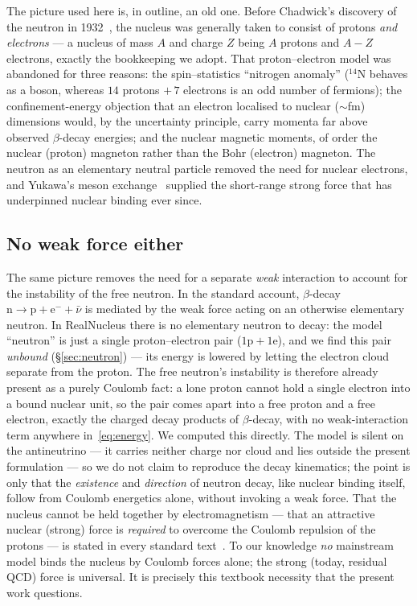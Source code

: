 \documentclass[11pt]{article}
\begin{document}
The picture used here is, in outline, an old one. Before Chadwick's discovery of the neutron in
1932~\cite{Chadwick1932}, the nucleus was generally taken to consist of protons \emph{and
electrons} --- a nucleus of mass $A$ and charge $Z$ being $A$ protons and $A-Z$ electrons,
exactly the bookkeeping we adopt. That proton--electron model was abandoned for three reasons:
the spin--statistics ``nitrogen anomaly'' ($^{14}$N behaves as a boson, whereas $14$ protons
$+\,7$ electrons is an odd number of fermions); the confinement-energy objection that an
electron localised to nuclear ($\sim$fm) dimensions would, by the uncertainty principle, carry
momenta far above observed $\beta$-decay energies; and the nuclear magnetic moments, of order
the nuclear (proton) magneton rather than the Bohr (electron) magneton. The neutron as an
elementary neutral particle removed the need for nuclear electrons, and Yukawa's meson
exchange~\cite{Yukawa1935} supplied the short-range strong force that has underpinned nuclear
binding ever since.

\subsection{No weak force either}

The same picture removes the need for a separate \emph{weak} interaction to account for the
instability of the free neutron. In the standard account, $\beta$-decay $\mathrm{n}\to
\mathrm{p}+\mathrm{e}^-+\bar\nu$ is mediated by the weak force acting on an otherwise elementary
neutron. In RealNucleus there is no elementary neutron to decay: the model ``neutron'' is just a
single proton--electron pair ($\mathrm{1p}+\mathrm{1e}$), and we find this pair \emph{unbound}
(\S\ref{sec:neutron}) --- its energy is lowered by letting the electron cloud separate from the
proton. The free neutron's instability is therefore already present as a purely Coulomb fact: a
lone proton cannot hold a single electron into a bound nuclear unit, so the pair comes apart into
a free proton and a free electron, exactly the charged decay products of $\beta$-decay, with no
weak-interaction term anywhere in~\eqref{eq:energy}. We computed this directly. The model is
silent on the antineutrino --- it carries neither charge nor cloud and lies outside the present
formulation --- so we do not claim to reproduce the decay kinematics; the point is only that the
\emph{existence} and \emph{direction} of neutron decay, like nuclear binding itself, follow from
Coulomb energetics alone, without invoking a weak force. That the nucleus cannot be held together by electromagnetism --- that an
attractive nuclear (strong) force is \emph{required} to overcome the Coulomb repulsion of the
protons --- is stated in every standard text~\cite{Krane,Povh,Griffiths}. To our knowledge
\emph{no} mainstream model binds the nucleus by Coulomb forces alone; the strong (today, residual
QCD) force is universal. It is precisely this textbook necessity that the present work questions.
\end{document}
